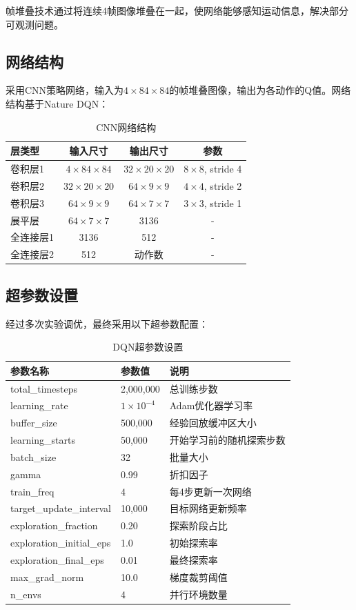 \documentclass[12pt,a4paper]{article}
\begin{document}
帧堆叠技术通过将连续4帧图像堆叠在一起，使网络能够感知运动信息，解决部分可观测问题。

\subsection{网络结构}

采用CNN策略网络，输入为$4 \times 84 \times 84$的帧堆叠图像，输出为各动作的Q值。网络结构基于Nature DQN：

\begin{table}[H]
\centering
\caption{CNN网络结构}
\begin{tabular}{lccc}
\toprule
层类型 & 输入尺寸 & 输出尺寸 & 参数 \\
\midrule
卷积层1 & $4 \times 84 \times 84$ & $32 \times 20 \times 20$ & $8 \times 8$, stride 4 \\
卷积层2 & $32 \times 20 \times 20$ & $64 \times 9 \times 9$ & $4 \times 4$, stride 2 \\
卷积层3 & $64 \times 9 \times 9$ & $64 \times 7 \times 7$ & $3 \times 3$, stride 1 \\
展平层 & $64 \times 7 \times 7$ & 3136 & - \\
全连接层1 & 3136 & 512 & - \\
全连接层2 & 512 & 动作数 & - \\
\bottomrule
\end{tabular}
\end{table}

\subsection{超参数设置}

经过多次实验调优，最终采用以下超参数配置：

\begin{table}[H]
\centering
\caption{DQN超参数设置}
\begin{tabular}{lll}
\toprule
参数名称 & 参数值 & 说明 \\
\midrule
total\_timesteps & 2,000,000 & 总训练步数 \\
learning\_rate & $1 \times 10^{-4}$ & Adam优化器学习率 \\
buffer\_size & 500,000 & 经验回放缓冲区大小 \\
learning\_starts & 50,000 & 开始学习前的随机探索步数 \\
batch\_size & 32 & 批量大小 \\
gamma & 0.99 & 折扣因子 \\
train\_freq & 4 & 每4步更新一次网络 \\
target\_update\_interval & 10,000 & 目标网络更新频率 \\
exploration\_fraction & 0.20 & 探索阶段占比 \\
exploration\_initial\_eps & 1.0 & 初始探索率 \\
exploration\_final\_eps & 0.01 & 最终探索率 \\
max\_grad\_norm & 10.0 & 梯度裁剪阈值 \\
n\_envs & 4 & 并行环境数量 \\
\bottomrule
\end{tabular}
\end{table}
\end{document}
